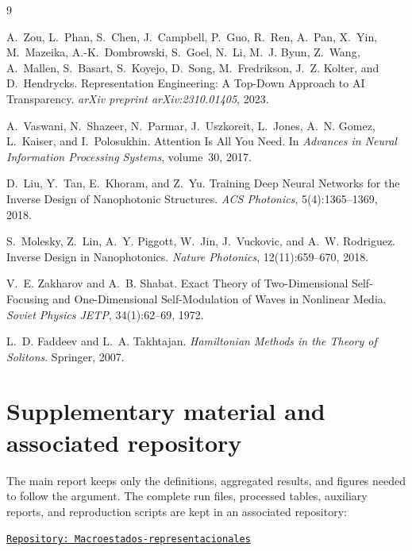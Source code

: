 \documentclass[10pt,twocolumn]{article}
\begin{document}
\clearpage
\begin{thebibliography}{9}
\footnotesize

A.~Zou, L.~Phan, S.~Chen, J.~Campbell, P.~Guo, R.~Ren, A.~Pan, X.~Yin, M.~Mazeika, A.-K.~Dombrowski, S.~Goel, N.~Li, M.~J. Byun, Z.~Wang, A.~Mallen, S.~Basart, S.~Koyejo, D.~Song, M.~Fredrikson, J.~Z. Kolter, and D.~Hendrycks.
\newblock Representation Engineering: A Top-Down Approach to AI Transparency.
\newblock \emph{arXiv preprint arXiv:2310.01405}, 2023.

A.~Vaswani, N.~Shazeer, N.~Parmar, J.~Uszkoreit, L.~Jones, A.~N. Gomez, L.~Kaiser, and I.~Polosukhin.
\newblock Attention Is All You Need.
\newblock In \emph{Advances in Neural Information Processing Systems}, volume~30, 2017.

D.~Liu, Y.~Tan, E.~Khoram, and Z.~Yu.
\newblock Training Deep Neural Networks for the Inverse Design of Nanophotonic Structures.
\newblock \emph{ACS Photonics}, 5(4):1365--1369, 2018.

S.~Molesky, Z.~Lin, A.~Y. Piggott, W.~Jin, J.~Vuckovic, and A.~W. Rodriguez.
\newblock Inverse Design in Nanophotonics.
\newblock \emph{Nature Photonics}, 12(11):659--670, 2018.

V.~E. Zakharov and A.~B. Shabat.
\newblock Exact Theory of Two-Dimensional Self-Focusing and One-Dimensional Self-Modulation of Waves in Nonlinear Media.
\newblock \emph{Soviet Physics JETP}, 34(1):62--69, 1972.

L.~D. Faddeev and L.~A. Takhtajan.
\newblock \emph{Hamiltonian Methods in the Theory of Solitons}.
\newblock Springer, 2007.

\end{thebibliography}

\appendix

\section{Supplementary material and associated repository}
\label{app:repo}

The main report keeps only the definitions, aggregated results, and figures needed to follow the argument. The complete run files, processed tables, auxiliary reports, and reproduction scripts are kept in an associated repository:

\begin{center}
\href{https://github.com/roldannahuelalejadro/Macroestados-representacionales}{\texttt{Repository: Macroestados-representacionales}}
\end{center}
\end{document}
